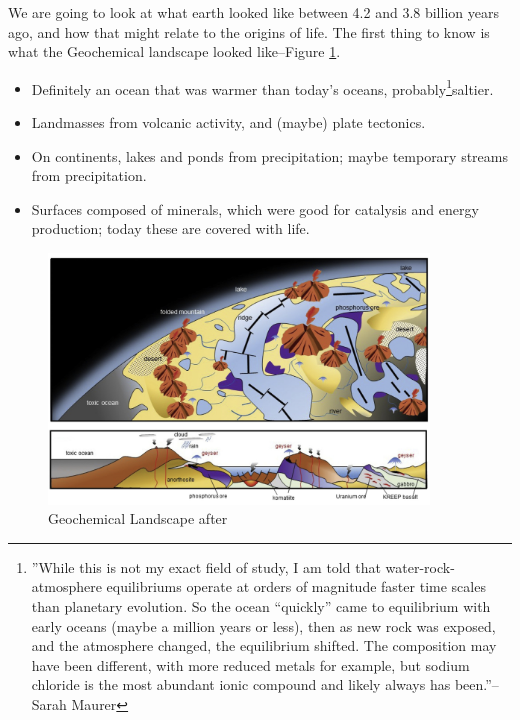 \documentclass[]{article}
\begin{document}
We are going to look at what earth looked like between 4.2 and 3.8 billion years ago, and how that might relate to the origins of life. The first thing to know is what the Geochemical landscape looked like--Figure \ref{fig:GeochemicalLandscape}.

  \begin{itemize}
	\item  Definitely an ocean that was warmer than today's oceans, probably\footnote{''While this is not my exact field of study, I am told that water-rock-atmosphere equilibriums operate at orders of magnitude faster time scales than planetary evolution. So the ocean “quickly” came to equilibrium with early oceans (maybe a million years or less), then as new rock was exposed, and the atmosphere changed, the equilibrium shifted. The composition may have been different, with more reduced metals for example, but sodium chloride is the most abundant ionic compound and likely always has been.''--Sarah Maurer}saltier.\cite{knauth1998salinity} 
	\item Landmasses from volcanic activity, and (maybe) plate tectonics.
	\item On continents, lakes and ponds from precipitation;  maybe temporary streams from precipitation.
	\item Surfaces composed of minerals, which were good for catalysis and energy production; today these are covered with life.
\end{itemize}

\begin{figure}[H]
	\caption[Geochemical Landscape]{Geochemical Landscape after \cite{kitadai2018origins}} \label{fig:GeochemicalLandscape}
	\includegraphics[width=0.9\textwidth]{GeochemicalLandscape}
\end{figure}
\end{document}
